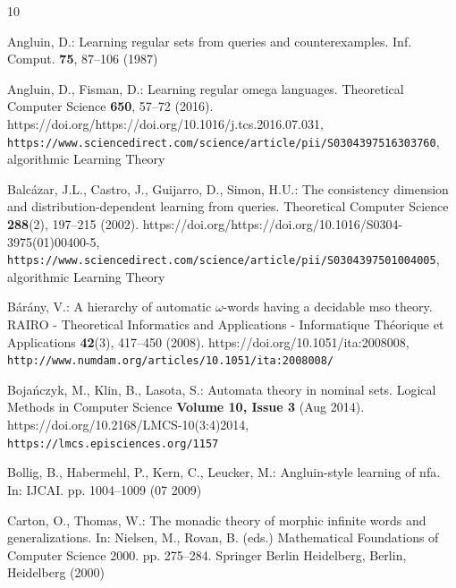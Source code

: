 \documentclass[11pt,a4paper]{amsart}
\theoremstyle{definition}
\begin{document}
\fi





\begin{thebibliography}{10}
\providecommand{\url}[1]{\texttt{#1}}
\providecommand{\urlprefix}{URL }
\providecommand{\doi}[1]{https://doi.org/#1}

Angluin, D.: Learning regular sets from queries and counterexamples. Inf.
  Comput.  \textbf{75},  87--106 (1987)

Angluin, D., Fisman, D.: Learning regular omega languages. Theoretical Computer
  Science  \textbf{650},  57--72 (2016).
  \doi{https://doi.org/10.1016/j.tcs.2016.07.031},
  \url{https://www.sciencedirect.com/science/article/pii/S0304397516303760},
  algorithmic Learning Theory

Balcázar, J.L., Castro, J., Guijarro, D., Simon, H.U.: The consistency
  dimension and distribution-dependent learning from queries. Theoretical
  Computer Science  \textbf{288}(2),  197--215 (2002).
  \doi{https://doi.org/10.1016/S0304-3975(01)00400-5},
  \url{https://www.sciencedirect.com/science/article/pii/S0304397501004005},
  algorithmic Learning Theory

B\'ar\'any, V.: A hierarchy of automatic $\omega $-words having a decidable mso
  theory. RAIRO - Theoretical Informatics and Applications - Informatique
  Th\'eorique et Applications  \textbf{42}(3),  417--450 (2008).
  \doi{10.1051/ita:2008008},
  \url{http://www.numdam.org/articles/10.1051/ita:2008008/}

Bojańczyk, M., Klin, B., Lasota, S.: {Automata theory in nominal sets}.
  {Logical Methods in Computer Science}  \textbf{{Volume 10, Issue 3}} (Aug
  2014). \doi{10.2168/LMCS-10(3:4)2014},
  \url{https://lmcs.episciences.org/1157}

Bollig, B., Habermehl, P., Kern, C., Leucker, M.: Angluin-style learning of
  nfa. In: IJCAI. pp. 1004--1009 (07 2009)

Carton, O., Thomas, W.: The monadic theory of morphic infinite words and
  generalizations. In: Nielsen, M., Rovan, B. (eds.) Mathematical Foundations
  of Computer Science 2000. pp. 275--284. Springer Berlin Heidelberg, Berlin,
  Heidelberg (2000)


\end{thebibliography}
\end{document}
